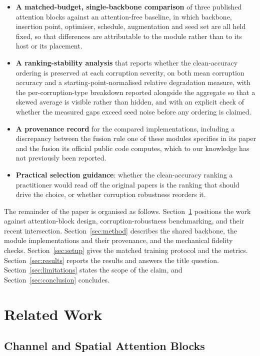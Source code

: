 \begin{itemize}
  \item \textbf{A matched-budget, single-backbone comparison} of three
    published attention blocks against an attention-free baseline, in which
    backbone, insertion point, optimiser, schedule, augmentation and seed set
    are all held fixed, so that differences are attributable to the module
    rather than to its host or its placement.
  \item \textbf{A ranking-stability analysis} that reports whether the
    clean-accuracy ordering is preserved at each corruption severity, on both
    mean corruption accuracy and a starting-point-normalised relative
    degradation measure, with the per-corruption-type breakdown reported
    alongside the aggregate so that a skewed average is visible rather than
    hidden, and with an explicit check of whether the measured gaps exceed
    seed noise before any ordering is claimed.
  \item \textbf{A provenance record} for the compared implementations,
    including a discrepancy between the fusion rule one of these modules
    specifies in its paper and the fusion its official public code computes,
    which to our knowledge has not previously been reported.
  \item \textbf{Practical selection guidance}: whether the clean-accuracy
    ranking a practitioner would read off the original papers is the ranking
    that should drive the choice, or whether corruption robustness reorders it.
\end{itemize}

The remainder of the paper is organised as follows. Section~\ref{sec:related}
positions the work against attention-block design, corruption-robustness
benchmarking, and their recent intersection. Section~\ref{sec:method} describes
the shared backbone, the module implementations and their provenance, and the
mechanical fidelity checks. Section~\ref{sec:setup} gives the matched training
protocol and the metrics. Section~\ref{sec:results} reports the results and
answers the title question. Section~\ref{sec:limitations} states the scope of
the claim, and Section~\ref{sec:conclusion} concludes.

\section{Related Work}
\label{sec:related}

\subsection{Channel and Spatial Attention Blocks}

